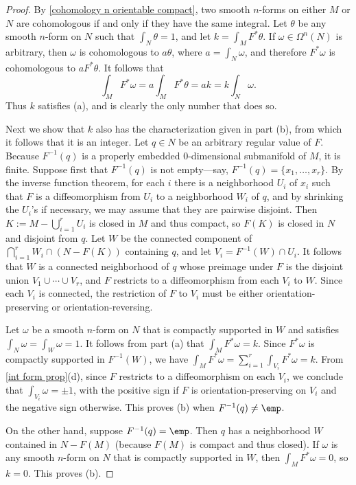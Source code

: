\begin{proof}
By \cref{cohomology n orientable compact}, two smooth $n$-forms on either $M$ or $N$ are cohomologous if and only if they have the same integral. Let $\theta$ be any smooth $n$-form on $N$ such that $\int_N\theta=1$, and let $k=\int_MF^*\theta$. If $\omega\in\Omega^n(N)$ is arbitrary, then $\omega$ is cohomologous to $a\theta$, where $a=\int_N\omega$, and therefore $F^*\omega$ is cohomologous to $aF^*\theta$. It follows that
\[\int_MF^*\omega=a\int_MF^*\theta=ak=k\int_N\omega.\]
Thus $k$ satisfies (a), and is clearly the only number that does so.\par
Next we show that $k$ also has the characterization given in part (b), from which it follows that it is an integer. Let $q\in N$ be an arbitrary regular value of $F$. Because $F^{-1}(q)$ is a properly embedded $0$-dimensional submanifold of $M$, it is finite. Suppose first that $F^{-1}(q)$ is not empty---say, $F^{-1}(q)=\{x_1,\dots,x_r\}$. By the inverse function theorem, for each $i$ there is a neighborhood $U_i$ of $x_i$ such that $F$ is a diffeomorphism from $U_i$ to a neighborhood $W_i$ of $q$, and by shrinking the $U_i$'s if necessary, we may assume that they are pairwise disjoint. Then $K:=M-\bigcup_{i=1}^{r}U_i$ is closed in $M$ and thus compact, so $F(K)$ is closed in $N$ and disjoint from $q$. Let $W$ be the connected component of $\bigcap_{i=1}^{r}W_i\cap(N-F(K))$ containing $q$, and let $V_i=F^{-1}(W)\cap U_i$. It follows that $W$ is a connected neighborhood of $q$ whose preimage under $F$ is the disjoint union $V_1\cup\cdots\cup V_r$, and $F$ restricts to a diffeomorphism from each $V_i$ to $W$. Since each $V_i$ is connected, the restriction of $F$ to $V_i$ must be either orientation-preserving or orientation-reversing.\par
Let $\omega$ be a smooth $n$-form on $N$ that is compactly supported in $W$ and satisfies $\int_N\omega=\int_W\omega=1$. It follows from part (a) that $\int_MF^*\omega=k$. Since $F^*\omega$ is compactly supported in $F^{-1}(W)$, we have $\int_MF^*\omega=\sum_{i=1}^{r}\int_{V_i}F^*\omega=k$. From \cref{int form prop}(d), since $F$ restricts to a diffeomorphism on each $V_i$, we conclude that $\int_{V_i}\omega=\pm 1$, with the positive sign if $F$ is orientation-preserving on $V_i$ and the negative sign otherwise. This proves (b) when $F^{-1}(q)\neq\emp$.\par
On the other hand, suppose $F^{-1}(q)=\emp$. Then $q$ has a neighborhood $W$ contained in $N-F(M)$ (because $F(M)$ is compact and thus closed). If $\omega$ is any smooth $n$-form on $N$ that is compactly supported in $W$, then $\int_MF^*\omega=0$, so $k=0$. This proves (b).
\end{proof}
